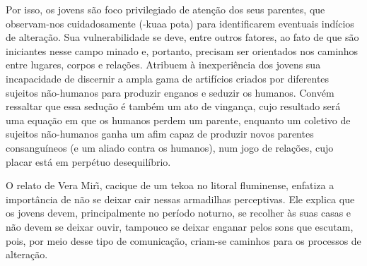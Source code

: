\documentclass{article}
\begin{document}
Por isso, os jovens s\~ao foco privilegiado de aten\c{c}\~ao dos seus
parentes, que observam-nos cuidadosamente (-kuaa pota) para
identificarem eventuais ind\'icios de altera\c{c}\~ao. Sua
vulnerabilidade se deve, entre outros fatores, ao fato de que s\~ao
iniciantes nesse campo minado e, portanto, precisam ser orientados nos
caminhos entre lugares, corpos e rela\c{c}\~oes. Atribuem \`a
inexperi\^encia dos jovens sua incapacidade de discernir a ampla gama
de artif\'icios criados por diferentes sujeitos n\~ao-humanos para
produzir enganos e seduzir os humanos. Conv\'em ressaltar que essa
sedu\c{c}\~ao \'e tamb\'em um ato de vingan\c{c}a, cujo resultado
ser\'a uma equa\c{c}\~ao em que os humanos perdem um parente, enquanto
um coletivo de sujeitos n\~ao-humanos ganha um afim capaz de produzir
novos parentes consangu\'ineos (e um aliado contra os humanos), num
jogo de rela\c{c}\~oes, cujo placar est\'a em perp\'etuo
desequil\'ibrio.

O relato de Vera Mir\~\i, cacique de um tekoa no litoral fluminense,
enfatiza a import\^ancia de n\~ao se deixar cair nessas armadilhas
perceptivas. Ele explica que os jovens devem, principalmente no
per\'iodo noturno, se recolher \`as suas casas e n\~ao devem se deixar
ouvir, tampouco se deixar enganar pelos sons que escutam, pois, por
meio desse tipo de comunica\c{c}\~ao, criam-se caminhos para os
processos de altera\c{c}\~ao.
\end{document}
